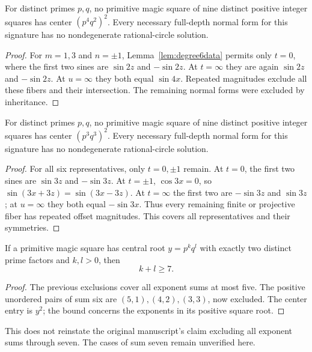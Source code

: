 \begin{theorem}\label{thm:42}
For distinct primes $p,q$, no primitive magic square of nine distinct positive integer squares has center $(p^4q^2)^2$. Every necessary full-depth normal form for this signature has no nondegenerate rational-circle solution.
\end{theorem}
\begin{proof}
For $m=1,3$ and $n=\pm1$, Lemma~\ref{lem:degree6data} permits only $t=0$, where the first two sines are $\sin2z$ and $-\sin2z$. At $t=\infty$ they are again $\sin2z$ and $-\sin2z$. At $u=\infty$ they both equal $\sin4x$. Repeated magnitudes exclude all these fibers and their intersection. The remaining normal forms were excluded by inheritance.
\end{proof}

\begin{theorem}\label{thm:33}
For distinct primes $p,q$, no primitive magic square of nine distinct positive integer squares has center $(p^3q^3)^2$. Every necessary full-depth normal form for this signature has no nondegenerate rational-circle solution.
\end{theorem}
\begin{proof}
For all six representatives, only $t=0,\pm1$ remain. At $t=0$, the first two sines are $\sin3z$ and $-\sin3z$. At $t=\pm1$, $\cos3x=0$, so $\sin(3x+3z)=\sin(3x-3z)$. At $t=\infty$ the first two are $-\sin3z$ and $\sin3z$; at $u=\infty$ they both equal $-\sin3x$. Thus every remaining finite or projective fiber has repeated offset magnitudes. This covers all representatives and their symmetries.
\end{proof}

\begin{corollary}\label{cor:bound}
If a primitive magic square has central root $y=p^kq^l$ with exactly two distinct prime factors and $k,l>0$, then
\[
\boxed{k+l\ge7.}
\]
\end{corollary}
\begin{proof}
The previous exclusions cover all exponent sums at most five. The positive unordered pairs of sum six are $(5,1),(4,2),(3,3)$, now excluded. The center entry is $y^2$; the bound concerns the exponents in its positive square root.
\end{proof}
This does not reinstate the original manuscript's claim excluding all exponent sums through seven. The cases of sum seven remain unverified here.

